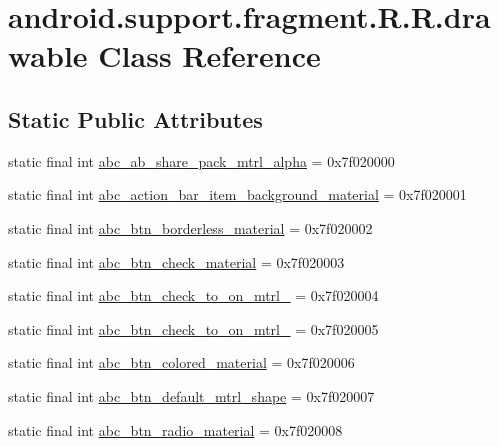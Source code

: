 \hypertarget{classandroid_1_1support_1_1fragment_1_1_r_1_1drawable}{
\section{android.support.fragment.R.R.drawable Class Reference}
\label{classandroid_1_1support_1_1fragment_1_1_r_1_1drawable}
}
\subsection*{Static Public Attributes}
\begin{CompactItemize}
\item 
static final int \hyperlink{classandroid_1_1support_1_1fragment_1_1_r_1_1drawable_6236c9be0b8d3677a1e1f1050ec3db3a}{abc\_\-ab\_\-share\_\-pack\_\-mtrl\_\-alpha} = 0x7f020000
\item 
static final int \hyperlink{classandroid_1_1support_1_1fragment_1_1_r_1_1drawable_3ee7e425856d0612a2464368e4395d47}{abc\_\-action\_\-bar\_\-item\_\-background\_\-material} = 0x7f020001
\item 
static final int \hyperlink{classandroid_1_1support_1_1fragment_1_1_r_1_1drawable_cec9074cb3c2ae5412847628a6a72fc3}{abc\_\-btn\_\-borderless\_\-material} = 0x7f020002
\item 
static final int \hyperlink{classandroid_1_1support_1_1fragment_1_1_r_1_1drawable_5bb6a4b80d1cfae1289476ce8b50dae4}{abc\_\-btn\_\-check\_\-material} = 0x7f020003
\item 
static final int \hyperlink{classandroid_1_1support_1_1fragment_1_1_r_1_1drawable_5def5c8d928409c00189a8b9589687d8}{abc\_\-btn\_\-check\_\-to\_\-on\_\-mtrl\_} = 0x7f020004
\item 
static final int \hyperlink{classandroid_1_1support_1_1fragment_1_1_r_1_1drawable_c576d57d29ccfa052c06845d966d2db2}{abc\_\-btn\_\-check\_\-to\_\-on\_\-mtrl\_} = 0x7f020005
\item 
static final int \hyperlink{classandroid_1_1support_1_1fragment_1_1_r_1_1drawable_18f3862c1b475900efc0d7ef0c117544}{abc\_\-btn\_\-colored\_\-material} = 0x7f020006
\item 
static final int \hyperlink{classandroid_1_1support_1_1fragment_1_1_r_1_1drawable_097ba0d6f82317c89cdf05caf92998cf}{abc\_\-btn\_\-default\_\-mtrl\_\-shape} = 0x7f020007
\item 
static final int \hyperlink{classandroid_1_1support_1_1fragment_1_1_r_1_1drawable_ccdb5435d5e308bf564e454e900ec164}{abc\_\-btn\_\-radio\_\-material} = 0x7f020008

\end{CompactItemize}
